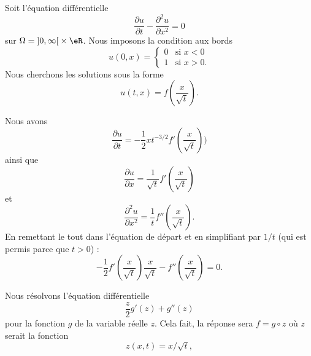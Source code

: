 Soit l'équation différentielle
\begin{equation}        \label{EQooPGDPooTjiVhB}
	\frac{ \partial u }{ \partial t }-\frac{ \partial^2u }{ \partial x^2 }=0
\end{equation}
sur \( \Omega=\mathopen] 0 , \infty \mathclose[\times \eR\). Nous imposons la condition aux bords
\begin{equation}        \label{EQooJHPVooMkvODe}
	u(0,x)=\begin{cases}
		0 & \text{si } x<0  \\
		1 & \text{si } x>0.
	\end{cases}
\end{equation}
Nous cherchons les solutions sous la forme
\begin{equation}
	u(t,x)=f\left( \frac{ x }{ \sqrt{ t } } \right).
\end{equation}

Nous avons
\begin{equation}
	\frac{ \partial u }{ \partial t }=-\frac{ 1 }{2}xt^{-3/2}f'\left( \frac{ x }{ \sqrt{ t } } \right))
\end{equation}
ainsi que
\begin{equation}
	\frac{ \partial u }{ \partial x }=\frac{1}{ \sqrt{ t } }f'\left( \frac{ x }{ \sqrt{ t } } \right)
\end{equation}
et
\begin{equation}
	\frac{ \partial^2u }{ \partial x^2 }=\frac{1}{ t }f''\left( \frac{ x }{ \sqrt{ t } } \right).
\end{equation}
En remettant le tout dans l'équation de départ et en simplifiant par \( 1/t\) (qui est permis parce que \( t>0\)) :
\begin{equation}        \label{EQooCRKIooYNhvaA}
	-\frac{ 1 }{2}f'\left( \frac{ x }{ \sqrt{ t } } \right)\frac{ x }{ \sqrt{ t } }-f''\left( \frac{ x }{ \sqrt{ t } } \right)=0.
\end{equation}

Nous résolvons l'équation différentielle
\begin{equation}        \label{EQooEFQPooGWVoUq}
	\frac{ z }{ 2 }g'(z)+g''(z)
\end{equation}
pour la fonction \( g\) de la variable réelle \( z\). Cela fait, la réponse sera \( f=g\circ z\) où \( z\) serait la fonction
\begin{equation}
	z(x,t)=x/\sqrt{ t },
\end{equation}

